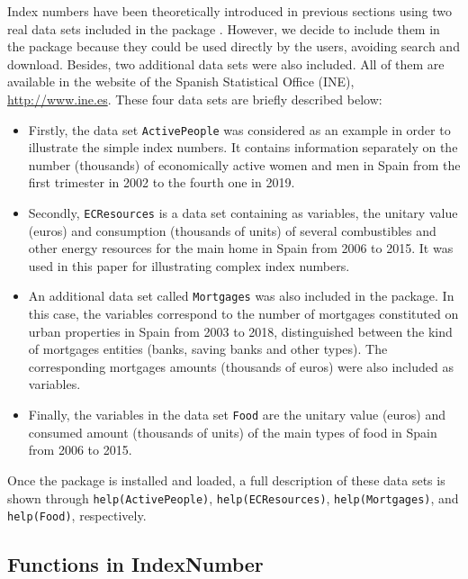 Index numbers have been theoretically introduced in previous sections using two real data sets included in the package .  However, we decide to include them in the package because they could be used directly by the users, avoiding  search and  download. Besides, two additional data sets were also included. All of them are  available in the website of the Spanish Statistical Office (INE), \url{http://www.ine.es}. These four data sets are briefly described below:\vspace{-0.15 cm}
\begin{itemize}
	\item Firstly, the data set \verb|ActivePeople| was considered as an example in order to illustrate the simple index numbers. It contains information separately on the number (thousands) of economically active women and men in Spain from the first trimester in 2002 to the fourth one in 2019.  

\item Secondly, \verb|ECResources| is a data set containing as variables, the unitary value (euros) and consumption (thousands of units) of several combustibles and other energy resources for the main home in Spain from 2006 to 2015. It was used in this paper for illustrating complex index numbers.

\item An additional data set called \verb|Mortgages| was also included in the package. In this case, the variables correspond to the number of mortgages constituted on urban properties in Spain from 2003 to 2018, distinguished between the kind of mortgages entities (banks, saving banks and other types). The corresponding mortgages amounts (thousands of euros) were also included as variables.

\item Finally, the variables in the data set \verb|Food| are the unitary value (euros) and consumed amount (thousands of units) of the main types of food in Spain from 2006 to 2015. 
\end{itemize}

Once the package is installed and loaded, a full description of these data sets is shown through \verb|help(ActivePeople)|, \verb|help(ECResources)|, \verb|help(Mortgages)|, and \verb|help(Food)|, respectively.

\subsection{Functions in IndexNumber}

